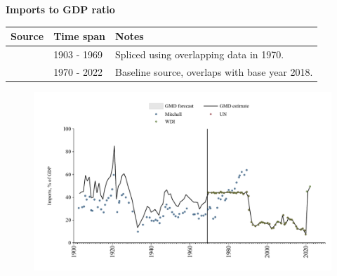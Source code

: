 \documentclass[12pt,a4paper,landscape]{article}
\begin{document}
\begin{adjustbox}{max totalsize={\paperwidth}{\paperheight},center}
\begin{minipage}[t][\textheight][t]{\textwidth}
\vspace*{0.5cm}
{}
\begin{center}
{\Large\bfseries Imports to GDP ratio}
\end{center}
\vspace{0.5cm}
\begin{table}[H]
\centering
\small
\begin{tabular}{|l|l|l|}
\hline
\textbf{Source} & \textbf{Time span} & \textbf{Notes} \\
\hline
\rowcolor{white}\cite{Mitchell}& 1903 - 1969 &Spliced using overlapping data in 1970. \\
\rowcolor{lightgray}\cite{WDI}& 1970 - 2022 &Baseline source, overlaps with base year 2018. \\
\hline
\end{tabular}
\end{table}
\begin{figure}[H]
\centering
\includegraphics[width=\textwidth,height=0.6\textheight,keepaspectratio]{graphs/CUB_imports_GDP.pdf}
\end{figure}
\end{minipage}
\end{adjustbox}
\end{document}
